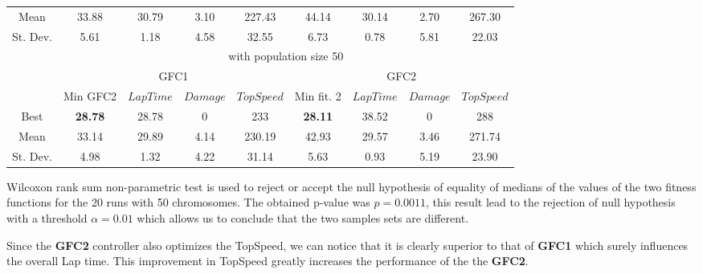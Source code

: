\documentclass[conference]{IEEEtran}
\begin{document}
\begin{table}[ht]
{{\begin{tabular}{|c||c|c|c|c||c|c|c|c|}
				\hline
				Mean &33.88 &30.79 &3.10&227.43&   44.14&  30.14 &   2.70&267.30\\ 
				St. Dev.&5.61&1.18&4.58&32.55&6.73&0.78 &5.81  & 22.03\\
				\hline
				\hline
				&\multicolumn{8}{c||}{ with population size 50}\\
				\hline
				&\multicolumn{4}{c||}{GFC1}&\multicolumn{4}{c|}{GFC2}\\
				\cline{2-9}
				& Min GFC2 & $LapTime$ & $Damage$ & $TopSpeed$& Min fit. 2& $LapTime$ & $Damage$ & $TopSpeed$\\
				\hline
				Best &\textbf{28.78}& 28.78& 0&233&\textbf{28.11} & 38.52& 0& 288\\
				\hline
				Mean &33.14 &29.89 &4.14&230.19&   42.93&  29.57 &   3.46&271.74\\ 
				St. Dev.&4.98&1.32&4.22&31.14&5.63&0.93 &5.19  & 23.90\\
				\hline
				
			\end{tabular}
		}\label{tab:runsresults}
	}
\end{table}
Wilcoxon rank sum non-parametric test is used to reject or accept the
null hypothesis of equality of medians of the values of the two
fitness functions for the 20 runs with 50 chromosomes. The obtained
p-value was $p =  0.0011$, this result lead to the rejection of null
hypothesis with a threshold $\alpha=0.01$ which allows us to conclude
that the two samples sets are different. 

Since the \textbf{GFC2} controller also optimizes the TopSpeed, we can
notice that it is clearly superior to that of \textbf{GFC1} which
surely influences the overall Lap time. This improvement in TopSpeed
greatly increases the performance of the the \textbf{GFC2}.
\end{document}
